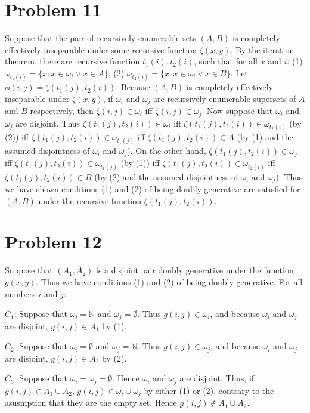 \documentclass{article}
\newcommand{\N}{\mathbb{N}}
\theoremstyle{definition}
\begin{document}
\section*{Problem 11}
Suppose that the pair of recursively enumerable sets $(A,B)$ is completely effectively inseparable under some recursive function $\zeta(x,y)$. By the iteration theorem, there are recursive 
function $t_1(i),t_2(i)$, such that for all $x$ and $i$:\newline 
(1) $\omega_{t_1(i)}=\{x:x\in\omega_i\vee x\in A\}$;\newline
(2) $\omega_{t_2(i)}=\{x:x\in\omega_i\vee x\in B\}$.\newline
Let $\phi(i,j)=\zeta(t_1(j),t_2(i))$. Because $(A,B)$ is completely effectively inseparable under $\zeta(x,y)$, if $\omega_i$ and $\omega_j$ are recursively enumerable supersets of $A$ and 
$B$ respectively, then $\zeta(i,j)\in\omega_i$ iff $\zeta(i,j)\in\omega_j$. Now suppose that $\omega_i$ and $\omega_j$ are disjoint. 
Thus $\zeta(t_1(j),t_2(i))\in\omega_i$ iff $\zeta(t_1(j),t_2(i))\in\omega_{t_2(i)}$ (by (2)) iff $\zeta(t_1(j),t_2(i))\in\omega_{t_1(j)}$ iff $\zeta(t_1(j),t_2(i))\in A$ (by (1) and the assumed 
disjointness of $\omega_i$ and $\omega_j$). On the other hand, $\zeta(t_1(j),t_2(i))\in\omega_j$ iff $\zeta(t_1(j),t_2(i))\in\omega_{t_1(j)}$ 
(by (1)) iff $\zeta(t_1(j),t_2(i))\in\omega_{t_2(i)}$ iff $\zeta(t_1(j),t_2(i))\in B$ (by (2) and the assumed disjointness of $\omega_i$ and $\omega_j$). Thus we have shown conditions 
(1) and (2) of being doubly generative are satisfied for $(A,B)$ under the recursive function $\zeta(t_1(j),t_2(i))$.

\section*{Problem 12}
Suppose that $(A_1,A_2)$ is a disjoint pair doubly generative under the function $g(x,y)$. Thus we have conditions (1) and (2) of being doubly generative. For all numbers $i$ and $j$:


$C_1$: Suppose that $\omega_i=\N$ and $\omega_j=\emptyset$. Thus $g(i,j)\in\omega_i$, and because $\omega_i$ and $\omega_j$ are disjoint, $g(i,j)\in A_1$ by (1).\newline


$C_2$: Suppose that $\omega_i=\emptyset$ and $\omega_j=\N$. Thus $g(i,j)\in\omega_j$, and because $\omega_i$ and $\omega_j$ are disjoint, $g(i,j)\in A_2$ by (2).\newline


$C_3$: Suppose that $\omega_i=\omega_j=\emptyset$. Hence $\omega_i$ and $\omega_j$ are disjoint. Thus, if $g(i,j)\in A_1\cup A_2$, $g(i,j)\in\omega_i\cup\omega_j$ by either (1) or (2), 
contrary to the asusmption that they are the empty set. Hence $g(i,j)\notin A_1\cup A_2$.
\end{document}
